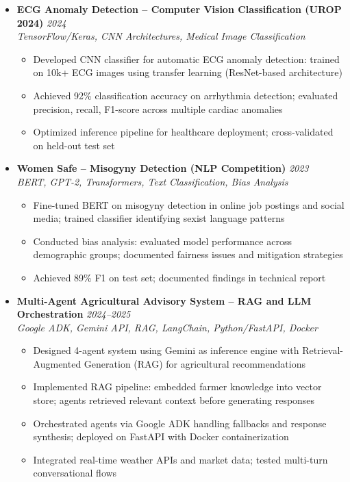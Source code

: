 \documentclass[a4paper,11pt]{article}
\begin{document}
\begin{itemize}[leftmargin=*, label={-}]
\item \textbf{ECG Anomaly Detection -- Computer Vision Classification (UROP 2024)} \hfill \textit{2024} \\
\textit{TensorFlow/Keras, CNN Architectures, Medical Image Classification} \vspace{-2pt}
    \begin{itemize}[leftmargin=0.4cm, nosep, label=\tiny$\bullet$]
        \item Developed CNN classifier for automatic ECG anomaly detection: trained on 10k+ ECG images using transfer learning (ResNet-based architecture)
        \item Achieved 92\% classification accuracy on arrhythmia detection; evaluated precision, recall, F1-score across multiple cardiac anomalies
        \item Optimized inference pipeline for healthcare deployment; cross-validated on held-out test set
    \end{itemize}

\item \textbf{Women Safe -- Misogyny Detection (NLP Competition)} \hfill \textit{2023} \\
\textit{BERT, GPT-2, Transformers, Text Classification, Bias Analysis} \vspace{-2pt}
    \begin{itemize}[leftmargin=0.4cm, nosep, label=\tiny$\bullet$]
        \item Fine-tuned BERT on misogyny detection in online job postings and social media; trained classifier identifying sexist language patterns
        \item Conducted bias analysis: evaluated model performance across demographic groups; documented fairness issues and mitigation strategies
        \item Achieved 89\% F1 on test set; documented findings in technical report
    \end{itemize}

\item \textbf{Multi-Agent Agricultural Advisory System -- RAG and LLM Orchestration} \hfill \textit{2024--2025} \\
\textit{Google ADK, Gemini API, RAG, LangChain, Python/FastAPI, Docker} \vspace{-2pt}
    \begin{itemize}[leftmargin=0.4cm, nosep, label=\tiny$\bullet$]
        \item Designed 4-agent system using Gemini as inference engine with Retrieval-Augmented Generation (RAG) for agricultural recommendations
        \item Implemented RAG pipeline: embedded farmer knowledge into vector store; agents retrieved relevant context before generating responses
        \item Orchestrated agents via Google ADK handling fallbacks and response synthesis; deployed on FastAPI with Docker containerization
        \item Integrated real-time weather APIs and market data; tested multi-turn conversational flows
    \end{itemize}


\end{itemize}
\end{document}
